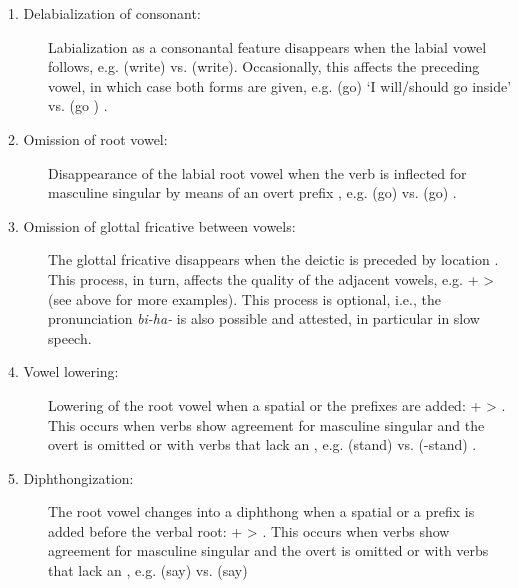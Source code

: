 \begin{description}
\item[1. Delabialization of consonant:] Labialization as a consonantal feature disappears when the labial vowel  follows, e.g.  (write) vs.  (write). Occasionally, this affects the preceding vowel, in which case both forms are given, e.g.  (go) `I will\slash should go inside' vs.  (go ) .

\item[2. Omission of root vowel:] Disappearance of the labial root vowel when the verb is inflected for masculine singular by means of an overt prefix , e.g.  (go)  vs.  (go) .

\item[3. Omission of glottal fricative between vowels:] The glottal fricative disappears when the deictic   is preceded by location . This process, in turn, affects the quality of the adjacent vowels, e.g.  +  >  (see  above for more examples). This process is optional, i.e., the pronunciation \textit{bi-ha-} is also possible and attested, in particular in slow speech.

\item[4. Vowel lowering:] Lowering of the root vowel  when a spatial   or the  prefixes  are added:  +  > . This occurs when verbs show agreement for masculine singular and the overt  is omitted or with verbs that lack an , e.g.  (stand)  vs.  (-stand) .

\item[5. Diphthongization:] The root vowel  changes into a diphthong when a spatial   or a  prefix  is added before the verbal root:  +  > . This occurs when verbs show agreement for masculine singular and the overt  is omitted or with verbs that lack an , e.g.  (say)  vs.  (say) 


\end{description}
